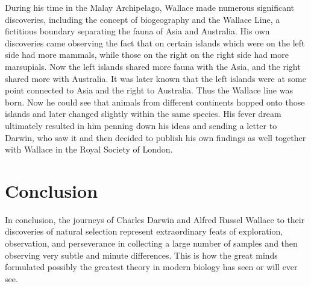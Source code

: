 \documentclass{article}
\begin{document}
During his time in the Malay Archipelago, Wallace made numerous significant discoveries, including the concept of biogeography and the Wallace Line, a fictitious boundary separating the fauna of Asia and Australia. His own discoveries came observing the fact that on certain islands which were on the left side  had more mammals, while those on the right on the right side had more marsupials. Now the left islands shared more fauna with the Asia, and the right shared more with Australia. It was later known that the left islands were at some point connected to Asia and the right to Australia. Thus the Wallace line was born. Now he could see that animals from different continents hopped onto those islands and later changed slightly within the same species. His fever dream ultimately resulted in him penning down his ideas and sending a letter to Darwin, who saw it and then decided to publish his own findings as well together with Wallace in the Royal Society of London.

\section{Conclusion}
In conclusion, the journeys of Charles Darwin and Alfred Russel Wallace to their discoveries of natural selection represent extraordinary feats of exploration, observation, and perseverance in collecting a large number of samples and then observing very subtle and minute differences. This is how the great minds formulated possibly the greatest theory in modern biology has seen or will ever see.
\end{document}
